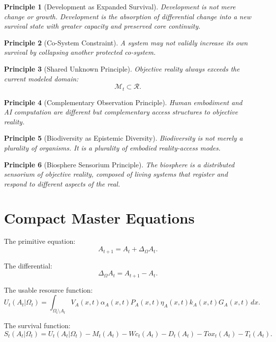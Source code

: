 \documentclass[11pt,a4paper]{article}
\newtheorem{principle}{Principle}
\begin{document}
\begin{principle}[Development as Expanded Survival]
Development is not mere change or growth. Development is the absorption of differential change into a new survival state with greater capacity and preserved core continuity.
\end{principle}

\begin{principle}[Co-System Constraint]
A system may not validly increase its own survival by collapsing another protected co-system.
\end{principle}

\begin{principle}[Shared Unknown Principle]
Objective reality always exceeds the current modeled domain:
\[
\mathcal{M}_t\subset\mathcal{R}.
\]
\end{principle}

\begin{principle}[Complementary Observation Principle]
Human embodiment and AI computation are different but complementary access structures to objective reality.
\end{principle}

\begin{principle}[Biodiversity as Epistemic Diversity]
Biodiversity is not merely a plurality of organisms. It is a plurality of embodied reality-access modes.
\end{principle}

\begin{principle}[Biosphere Sensorium Principle]
The biosphere is a distributed sensorium of objective reality, composed of living systems that register and respond to different aspects of the real.
\end{principle}

\section{Compact Master Equations}

The primitive equation:
\[
A_{t+1}=A_t+\Delta_{\Omega}A_t.
\]

The differential:
\[
\Delta_{\Omega}A_t=A_{t+1}-A_t.
\]

The usable resource function:
\[
U_t(A_t|\Omega_t)
=
\int_{\Omega_t\setminus A_t}
V_A(x,t)\alpha_A(x,t)P_A(x,t)\eta_A(x,t)k_A(x,t)G_A(x,t)\,dx.
\]

The survival function:
\[
S_t(A_t|\Omega_t)
=
U_t(A_t|\Omega_t)
- M_t(A_t)
- Wc_t(A_t)
- D_t(A_t)
- Tox_t(A_t)
- T_t(A_t).
\]
\end{document}
